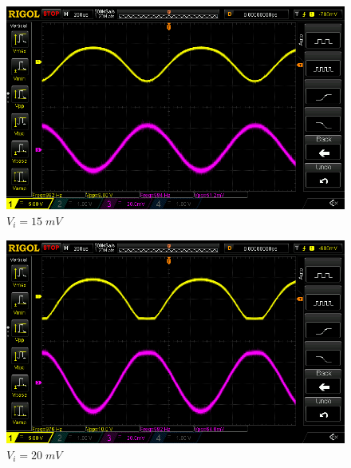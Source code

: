 \documentclass[uplatex,a4paper,11pt,oneside,openany]{jsbook}
\begin{document}
\begin{spacing}{0.71}
\begin{multicols}{2}
  \begin{figure}[H]
     \centering
      \includegraphics[keepaspectratio, scale=0.28, angle=0]
                  {rigol/figs/IOCharM1Y1_2kR/15mV.png}
                  \caption{$V_i=15\;mV$}
                  \label{fig:ioc15}
  \end{figure}

  \begin{figure}[H]
     \centering
      \includegraphics[keepaspectratio, scale=0.28, angle=0]
                {rigol/figs/IOCharM1Y1_2kR/20mV.png}
                \caption{$V_i=20\;mV$}
                \label{fig:ioc20}
  \end{figure}
\end{multicols}


\end{spacing}
\end{document}
